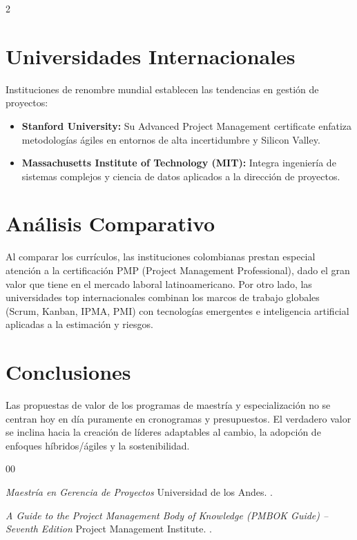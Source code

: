 \documentclass[10pt,a4paper]{article}
\begin{document}
	\begin{multicols}{2}
		\section{Universidades Internacionales}
			Instituciones de renombre mundial establecen las tendencias en gestión de proyectos:
			\begin{itemize}
			    \item \textbf{Stanford University:} Su Advanced Project Management certificate enfatiza metodologías ágiles en entornos de alta incertidumbre y Silicon Valley.
			    \item \textbf{Massachusetts Institute of Technology (MIT):} Integra ingeniería de sistemas complejos y ciencia de datos aplicados a la dirección de proyectos.
			\end{itemize}
		
		\section{Análisis Comparativo}
			Al comparar los currículos, las instituciones colombianas prestan especial atención a la certificación PMP (Project Management Professional), dado el gran valor que tiene en el mercado laboral latinoamericano. Por otro lado, las universidades top internacionales combinan los marcos de trabajo globales (Scrum, Kanban, IPMA, PMI) con tecnologías emergentes e inteligencia artificial aplicadas a la estimación y riesgos.
			
		\section{Conclusiones}
			Las propuestas de valor de los programas de maestría y especialización no se centran hoy en día puramente en cronogramas y presupuestos. El verdadero valor se inclina hacia la creación de líderes adaptables al cambio, la adopción de enfoques híbridos/ágiles y la sostenibilidad.
			
	    \begin{thebibliography}{00}
	    
	        \newblock \textit{Maestría en Gerencia de Proyectos}
	        \newblock Universidad de los Andes.
	        .
	    
	        \newblock \textit{A Guide to the Project Management Body of Knowledge (PMBOK Guide) – Seventh Edition}
	        \newblock Project Management Institute.
	        .
	        
	    \end{thebibliography}
	\end{multicols}
	
\end{document}
